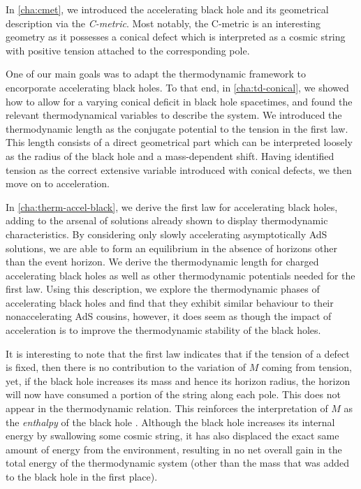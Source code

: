 \documentclass[
twoside,
openright,
frontopenright,
]{dmathesis}
\begin{document}
In \cref{cha:cmet}, we introduced the accelerating black hole and its
geometrical description via the \emph{C-metric}. Most notably, the C-metric is
an interesting geometry as it possesses a conical defect which is interpreted as
a cosmic string with positive tension attached to the corresponding pole.

One of our main goals was to adapt the thermodynamic framework to encorporate
accelerating black holes. To that end, in \cref{cha:td-conical}, we showed how
to allow for a varying conical deficit in black hole spacetimes, and found the
relevant thermodynamical variables to describe the system. We introduced the
thermodynamic length as the conjugate potential to the tension in the first
law. This length consists of a direct geometrical part which can be interpreted
loosely as the radius of the black hole and a mass-dependent shift. Having
identified tension as the correct extensive variable introduced with conical
defects, we then move on to acceleration.

In \cref{cha:therm-accel-black}, we derive the first law for accelerating black
holes, adding to the arsenal of solutions already shown to display thermodynamic
characteristics. By considering only slowly accelerating asymptotically AdS
solutions, we are able to form an equilibrium in the absence of horizons other
than the event horizon. We derive the thermodynamic length for charged
accelerating black holes as well as other thermodynamic potentials needed for
the first law. Using this description, we explore the thermodynamic phases of
accelerating black holes and find that they exhibit similar behaviour to their
nonaccelerating AdS cousins, however, it does seem as though the impact of
acceleration is to improve the thermodynamic stability of the black holes.

It is interesting to note that the first law indicates that if the tension of a
defect is fixed, then there is no contribution to the variation of $M$ coming
from tension, yet, if the black hole increases its mass and hence its horizon
radius, the horizon will now have consumed a portion of the string along each
pole.  This does not appear in the thermodynamic relation. This reinforces the
interpretation of $M$ as the {\it enthalpy} of the black hole
\cite{Kastor:2009wy}.  Although the black hole increases its internal energy by
swallowing some cosmic string, it has also displaced the exact same amount of
energy from the environment, resulting in no net overall gain in the total
energy of the thermodynamic system (other than the mass that was added to the
black hole in the first place).
\end{document}

